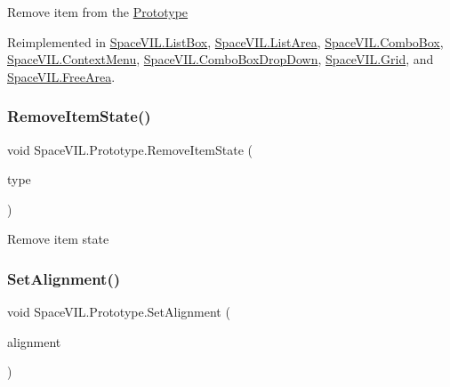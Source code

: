 Remove item from the \mbox{\hyperlink{class_space_v_i_l_1_1_prototype}{Prototype}} 



Reimplemented in \mbox{\hyperlink{class_space_v_i_l_1_1_list_box_a3fac47d275899619c3f705c24816ff87}{Space\+V\+I\+L.\+List\+Box}}, \mbox{\hyperlink{class_space_v_i_l_1_1_list_area_a0020756686088a62a43388973fa2d7bf}{Space\+V\+I\+L.\+List\+Area}}, \mbox{\hyperlink{class_space_v_i_l_1_1_combo_box_a646108f1b822d481ae32b68e7bd3f44f}{Space\+V\+I\+L.\+Combo\+Box}}, \mbox{\hyperlink{class_space_v_i_l_1_1_context_menu_a35bae3cc791ba6de129af36ddb0fb63b}{Space\+V\+I\+L.\+Context\+Menu}}, \mbox{\hyperlink{class_space_v_i_l_1_1_combo_box_drop_down_a78a089740c66f8d4cf151da273eafd73}{Space\+V\+I\+L.\+Combo\+Box\+Drop\+Down}}, \mbox{\hyperlink{class_space_v_i_l_1_1_grid_a75bf61cabb387baea7461141dce079fb}{Space\+V\+I\+L.\+Grid}}, and \mbox{\hyperlink{class_space_v_i_l_1_1_free_area_ae9b39df00c0fa786b4072b8e49e3aacc}{Space\+V\+I\+L.\+Free\+Area}}.

\mbox{\label{class_space_v_i_l_1_1_prototype_a2c7109a2346956afe3e03958e6d2701c}} 
\subsubsection{\texorpdfstring{Remove\+Item\+State()}{RemoveItemState()}}
{\footnotesize\ttfamily void Space\+V\+I\+L.\+Prototype.\+Remove\+Item\+State (\begin{DoxyParamCaption}\item[{Item\+State\+Type}]{type }\end{DoxyParamCaption})}



Remove item state 

\mbox{\label{class_space_v_i_l_1_1_prototype_ac9d6f8cfbc2716ee740a8a21eaff33a8}} 
\subsubsection{\texorpdfstring{Set\+Alignment()}{SetAlignment()}}
{\footnotesize\ttfamily void Space\+V\+I\+L.\+Prototype.\+Set\+Alignment (\begin{DoxyParamCaption}\item[{Item\+Alignment}]{alignment }\end{DoxyParamCaption})}




